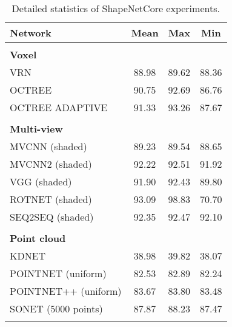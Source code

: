 \begin{table}[!h]
    \centering
	    \begin{tabular}{lccc}
	    	\hline
	    	\textbf{Network}       & \textbf{Mean} & \textbf{Max} & \textbf{Min} \\ \hline
	    	                       &               &              &              \\
	    	\textbf{Voxel }        &               &              &              \\
	    	VRN                    &     88.98     &    89.62     &    88.36     \\
	    	OCTREE                 &     90.75     &    92.69     &    86.76     \\
	    	OCTREE ADAPTIVE        &     91.33     &    93.26     &    87.67     \\\hline
	    	                       &               &              &              \\
	    	\textbf{Multi-view }   &               &              &              \\
	    	MVCNN (shaded)         &     89.23     &    89.54     &    88.65     \\
	    	MVCNN2 (shaded)        &     92.22     &    92.51     &    91.92     \\
	    	VGG (shaded)           &     91.90     &    92.43     &    89.80     \\
	    	ROTNET (shaded)        &     93.09     &    98.83     &    70.70     \\
	    	SEQ2SEQ (shaded)       &     92.35     &    92.47     &    92.10     \\\hline
	    	                       &               &              &              \\
	    	\textbf{Point cloud  } &               &              &              \\
	    	KDNET                  &     38.98     &    39.82     &    38.07     \\
	    	POINTNET (uniform)     &     82.53     &    82.89     &    82.24     \\
	    	POINTNET++ (uniform)   &     83.67     &    83.80     &    83.48     \\
	    	SONET (5000 points)    &     87.87     &    88.23     &    87.47     \\\hline
	    	                       &               &              &              \\ 
	    \end{tabular}
\caption{Detailed statistics of ShapeNetCore experiments.}
\label{Table:detailss}
\end{table}
